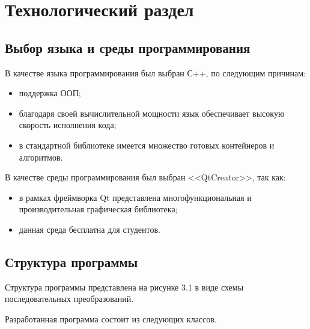 \chapter{Технологический раздел}

\section{Выбор языка и среды программирования}

В качестве языка программирования был выбран С++, по следующим причинам:

\begin{itemize}[label=---]
	\item поддержка ООП;
        \item благодаря своей вычислительной мощности язык обеспечивает высокую скорость исполнения кода;
	\item в стандартной библиотеке имеется множество готовых контейнеров и алгоритмов.
\end{itemize}

В качестве среды программирования был выбран <<QtCreator>>, так как:

\begin{itemize}[label=---]
	\item в рамках фреймворка Qt представлена многофункциональная и производительная графическая библиотека;
	\item данная среда бесплатна для студентов.
\end{itemize}


\section{Структура программы}

Структура программы представлена на рисунке 3.1 в виде схемы последовательных преобразований.


Разработанная программа состоит из следующих классов.
  
